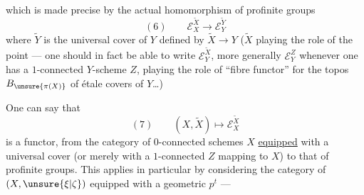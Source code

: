 
which is made precise by the actual homomorphism of profinite groups
\[
(6)\qquad \mathcal E_X^{\widetilde X}\longrightarrow\mathcal E_Y^{\widetilde Y}
\]
where $\widetilde Y$ is the universal cover of $Y$ defined by $\widetilde X\longrightarrow Y$ ($\widetilde X$ playing the role of the point --- one should in fact be able to write $\mathcal E_Y^{\widetilde X}$, more generally $\mathcal E_Y^Z$ whenever one has a $1$-connected $Y$-scheme $Z$, playing the role of ``fibre functor'' for the topos $B_{\unsure{\pi(X)}}$ of étale covers of $Y$\ldots)


One can say that
\[
(7)\qquad (X,\widetilde X)\longmapsto\mathcal E_X^{\widetilde X}
\]
is a functor, from the category of $0$-connected schemes $X$ \uline{equipped} with a universal cover (or merely with a $1$-connected $Z$ mapping to $X$) to that of profinite groups. This applies in particular by considering the category of $(X,\unsure{\xi|\zeta})$ equipped with a geometric $p^t$ ---

